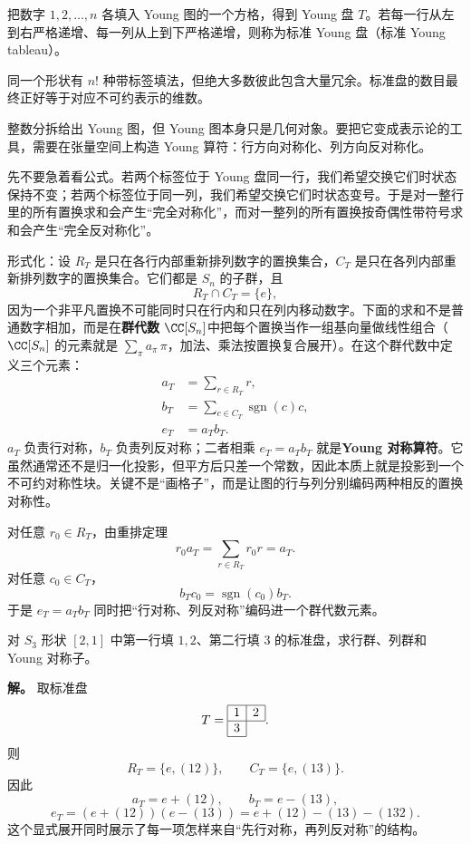 \begin{definition}
把数字 $1,2,\dots,n$ 各填入 Young 图的一个方格，得到 Young 盘 $T$。若每一行从左到右严格递增、每一列从上到下严格递增，则称为标准 Young 盘（标准 Young tableau）。
\label{def:young-tableau}
\end{definition}

同一个形状有 $n!$ 种带标签填法，但绝大多数彼此包含大量冗余。标准盘的数目最终正好等于对应不可约表示的维数。

整数分拆给出 Young 图，但 Young 图本身只是几何对象。要把它变成表示论的工具，需要在张量空间上构造 Young 算符：行方向对称化、列方向反对称化。

先不要急着看公式。若两个标签位于 Young 盘同一行，我们希望交换它们时状态保持不变；若两个标签位于同一列，我们希望交换它们时状态变号。于是对一整行里的所有置换求和会产生“完全对称化”，而对一整列的所有置换按奇偶性带符号求和会产生“完全反对称化”。

形式化：设 $R_T$ 是只在各行内部重新排列数字的置换集合，$C_T$ 是只在各列内部重新排列数字的置换集合。它们都是 $S_n$ 的子群，且
\[
R_T\cap C_T=\{e\},
\]
因为一个非平凡置换不可能同时只在行内和只在列内移动数字。下面的求和不是普通数字相加，而是在\textbf{群代数 $\CC[S_n]$}中把每个置换当作一组基向量做线性组合（$\CC[S_n]$ 的元素就是 $\sum_{\pi}a_\pi\,\pi$，加法、乘法按置换复合展开）。在这个群代数中定义三个元素：
\begin{align}
a_T&=\sum_{r\in R_T}r,\label{eq:row-symmetrizer}\\
b_T&=\sum_{c\in C_T}\operatorname{sgn}(c)c,\label{eq:column-antisymmetrizer}\\
e_T&=a_Tb_T.\label{eq:young-symmetrizer}
\end{align}
$a_T$ 负责行对称，$b_T$ 负责列反对称；二者相乘 $e_T=a_Tb_T$ 就是\textbf{Young 对称算符}。它虽然通常还不是归一化投影，但平方后只差一个常数，因此本质上就是投影到一个不可约对称性块。关键不是“画格子”，而是让图的行与列分别编码两种相反的置换对称性。

对任意 $r_0\in R_T$，由重排定理
\[
r_0a_T=\sum_{r\in R_T}r_0r=a_T.
\]
对任意 $c_0\in C_T$，
\[
b_Tc_0=\operatorname{sgn}(c_0)b_T.
\]
于是 $e_T=a_Tb_T$ 同时把“行对称、列反对称”编码进一个群代数元素。

\begin{example}
对 $S_3$ 形状 $[2,1]$ 中第一行填 $1,2$、第二行填 $3$ 的标准盘，求行群、列群和 Young 对称子。

\textbf{解。} 取标准盘
\[
T=\begin{array}{|c|c|}\hline 1&2\\\hline 3\\\cline{1-1}\end{array}.
\]
则
\[
R_T=\{e,(12)\},
\qquad
C_T=\{e,(13)\}.
\]
因此
\[
a_T=e+(12),
\qquad
b_T=e-(13),
\]
\[
e_T=(e+(12))(e-(13))
=e+(12)-(13)-(132).
\]
这个显式展开同时展示了每一项怎样来自“先行对称，再列反对称”的结构。
\end{example}

